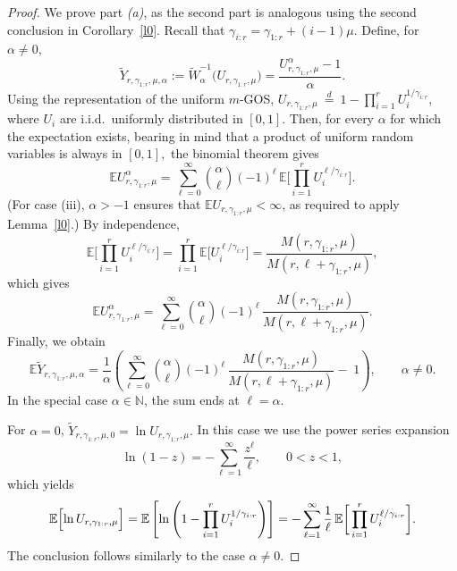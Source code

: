 \documentclass [11pt]{article}
\newcommand{\gos}{GOS}
\begin{document}
\begin{proof}	
    We prove part \textit{(a)}, as the second part is analogous using the second conclusion in Corollary~\ref{l0}. 
    Recall that $\gamma_{i:r}=\gamma_{1:r}+(i-1)\mu$. Define, for $\alpha\neq0,$
	$$
	\widetilde Y_{r,\gamma_{1:r},\mu,\alpha}
	:=\widetilde
    W_\alpha^{-1}\!\bigl(U_{r,\gamma_{1:r},\mu}\bigr)=\frac{U_{r,\gamma_{1:r},\mu}^{\alpha}-1}{\alpha}.
	$$
	Using the representation of the uniform $m$-\gos,
	$U_{r,\gamma_{1:r},\mu}\ \stackrel d=\ 
    1-\prod_{i=1}^r U_i^{1/\gamma_{i:r}}$,
	where $U_i$ are i.i.d.\ uniformly distributed in $[0,1]$.
    Then, for every $\alpha$ for which the expectation exists, bearing in mind that a product of uniform random variables is always in $[0,1],$ the binomial theorem gives
	$$
    \mathbb E U_{r,\gamma_{1:r},\mu}^{\alpha}
    =\sum_{\ell=0}^{\infty}\binom{\alpha}{\ell}(-1)^{\ell}\,\mathbb E\bigg[\prod_{i=1}^r U_i^{\ell/\gamma_{i:r}}\bigg].
    $$
    (For case (iii), $\alpha>-1$ ensures that $\mathbb{E} U_{r,\gamma_{1:r},\mu}<\infty$, as required to apply Lemma~\ref{l0}.) By independence,
	$$
	\mathbb E\bigg[\prod_{i=1}^r U_i^{\ell/\gamma_{i:r}}\bigg]
	=\prod_{i=1}^r \mathbb E\bigg[U_i^{\ell/\gamma_{i:r}}\bigg]
    =\frac{M(r,\gamma_{1:r},\mu)}{M(r,\ell+\gamma_{1:r},\mu)},
	$$
	which gives
	\begin{equation}
    \label{eq:expectation}\mathbb E U_{r,\gamma_{1:r},\mu}^{\alpha}
	=\sum_{\ell=0}^{\infty}\binom{\alpha}{\ell}(-1)^{\ell}\,
	\frac{M(r,\gamma_{1:r},\mu)}{M(r,\ell+\gamma_{1:r},\mu)}.
    \end{equation}
	Finally, we obtain
	$$
	\mathbb E \widetilde Y_{r,\gamma_{1:r},\mu,\alpha}
	=\frac{1}{\alpha}\left(
	\sum_{\ell=0}^{\infty}\binom{\alpha}{\ell}(-1)^{\ell}\,
	\frac{M(r,\gamma_{1:r},\mu)}{M(r,\ell+\gamma_{1:r},\mu)}
    -\;1\right),
	\qquad \alpha\neq 0.
    $$
    In the special case $\alpha\in\mathbb N$, the sum ends at $\ell=\alpha$.
	
    \smallskip
    
	For $\alpha=0$, $\widetilde Y_{r,\gamma_{1:r},\mu,0}
	=\ln U_{r,\gamma_{1:r},\mu}.$
	In this case we use the power series expansion
	$$
    \ln(1-z)=-\sum_{\ell=1}^\infty \frac{z^\ell}{\ell},\qquad 0<z<1,
    $$
	which yields
\begin{equation}
\label{eq:expectation0}	
\mathbb E\Bigl[\ln U_{r,\gamma_{1:r},\mu}\Bigr]
	=\mathbb E\left[\ln\left(1-\prod_{i=1}^r U_i^{1/\gamma_{i:r}}\right)\right]
	=-\sum_{\ell=1}^\infty \frac{1}{\ell}\,
    \mathbb{E}\bigg[\prod_{i=1}^r U_i^{\ell/\gamma_{i:r}}\bigg].
\end{equation}
	The conclusion follows similarly to the case $\alpha\neq0$.
\end{proof}
\end{document}
